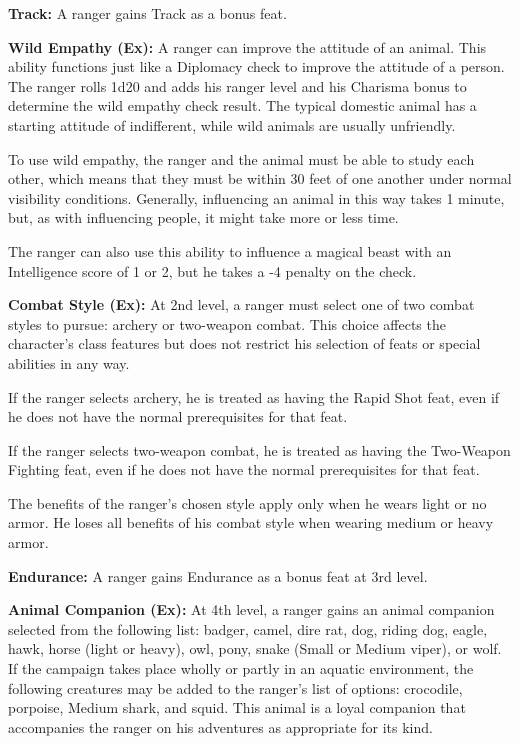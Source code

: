 \documentclass{article}
\begin{document}
\vspace{12pt}
\textbf{Track:} A ranger gains Track as a bonus feat.

\textbf{Wild Empathy (Ex): }A ranger can improve the attitude of an animal. This 
ability functions just like a Diplomacy check to improve the attitude of a person. 
The ranger rolls 1d20 and adds his ranger level and his Charisma bonus to determine 
the wild empathy check result. The typical domestic animal has a starting attitude 
of indifferent, while wild animals are usually unfriendly.

To use wild empathy, the ranger and the animal must be able to study each other, 
which means that they must be within 30 feet of one another under normal visibility 
conditions. Generally, influencing an animal in this way takes 1 minute, but, as 
with influencing people, it might take more or less time.

The ranger can also use this ability to influence a magical beast with an Intelligence 
score of 1 or 2, but he takes a -4 penalty on the check.

\textbf{Combat Style (Ex):} At 2nd level, a ranger must select one of two combat 
styles to pursue: archery or two-weapon combat. This choice affects the character's 
class features but does not restrict his selection of feats or special abilities 
in any way.

If the ranger selects archery, he is treated as having the Rapid Shot feat, even 
if he does not have the normal prerequisites for that feat.

If the ranger selects two-weapon combat, he is treated as having the Two-Weapon 
Fighting feat, even if he does not have the normal prerequisites for that feat.

The benefits of the ranger's chosen style apply only when he wears light or no 
armor. He loses all benefits of his combat style when wearing medium or heavy armor.

\textbf{Endurance:} A ranger gains Endurance as a bonus feat at 3rd level.

\textbf{Animal Companion (Ex):} At 4th level, a ranger gains an animal companion 
selected from the following list: badger, camel, dire rat, dog, riding dog, eagle, 
hawk, horse (light or heavy), owl, pony, snake (Small or Medium viper), or wolf. 
If the campaign takes place wholly or partly in an aquatic environment, the following 
creatures may be added to the ranger's list of options: crocodile, porpoise, Medium 
shark, and squid. This animal is a loyal companion that accompanies the ranger 
on his adventures as appropriate for its kind.
\end{document}
